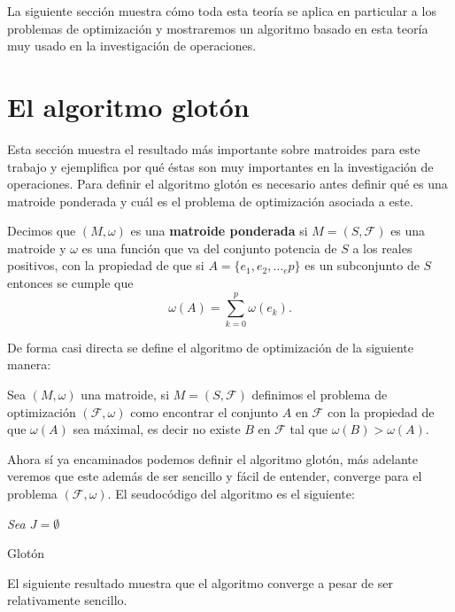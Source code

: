 La siguiente sección muestra cómo toda esta teoría se aplica en particular a los problemas de optimización y mostraremos un algoritmo basado en esta teoría muy usado en la investigación de operaciones. 

\section{El algoritmo glotón}

Esta sección muestra el resultado más importante sobre matroides para este trabajo y ejemplifica por qué éstas son muy importantes en la investigación de operaciones. Para definir el algoritmo glotón es necesario antes definir qué es una matroide ponderada y cuál es el problema de optimización asociada a este. 

\begin{dfn}
Decimos que $(M,\omega)$ es una \textbf{matroide ponderada} si $M=(S,\mathcal{F})$ es una matroide y $\omega$ es una función que va del conjunto potencia de $S$ a los reales positivos, con la propiedad de que si $A=\{e_1,e_2,\dots_ep\}$ es un subconjunto de $S$ entonces se cumple que $$\omega(A) = \sum_{k=0}^p \omega(e_k).$$
\end{dfn}

De forma casi directa se define el algoritmo de optimización de la siguiente manera:

\begin{dfn}
Sea $(M,\omega)$ una matroide, si $M=(S,\mathcal{F})$ definimos el problema de optimización $(\mathcal{F},\omega)$ como encontrar el conjunto $A$ en $\mathcal{F}$ con la propiedad de que $\omega(A)$ sea máximal, es decir no existe $B$ en $\mathcal{F}$ tal que $\omega(B) > \omega(A)$.
\end{dfn}

Ahora sí ya encaminados podemos definir el algoritmo glotón, más adelante veremos que este además de ser sencillo y fácil de entender, converge para el problema $(\mathcal{F},\omega)$. El seudocódigo del algoritmo es el siguiente:

\IncMargin{1em}
\begin{Algoritmo}[H]
\BlankLine
\emph{Sea $J=\emptyset$ \; }
\caption{Glotón}
\end{Algoritmo}
\DecMargin{1em}
El siguiente resultado muestra que el algoritmo converge a pesar de ser relativamente sencillo.

